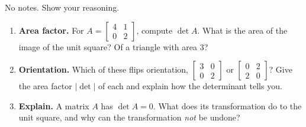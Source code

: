 \documentclass[10pt]{article}
\begin{document}
\namedateperiod

\vspace{0.15in}

No notes. Show your reasoning.

\begin{enumerate}[leftmargin=1.8em, itemsep=16pt]
  \item \textbf{Area factor.} For $A=\begin{bmatrix} 4 & 1 \\ 0 & 2 \end{bmatrix}$, compute $\det A$.
        What is the area of the image of the unit square? Of a triangle with area $3$?
        \vspace{1.5cm}
  \item \textbf{Orientation.} Which of these flips orientation, $\begin{bmatrix} 3 & 0 \\ 0 & 2
        \end{bmatrix}$ or $\begin{bmatrix} 0 & 2 \\ 2 & 0 \end{bmatrix}$? Give the area factor $|\det|$ of
        each and explain how the determinant tells you.
        \vspace{1.5cm}
  \item \textbf{Explain.} A matrix $A$ has $\det A=0$. What does its transformation do to the unit
        square, and why can the transformation \emph{not} be undone? 
\end{enumerate}
\end{document}
